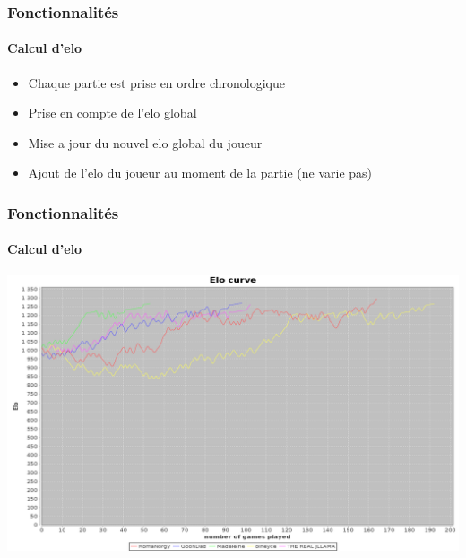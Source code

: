 \documentclass{beamer}
\begin{document}
\begin{frame}
  \frametitle{Fonctionnalités}
  \framesubtitle{Calcul d'elo}
  \begin{itemize}
  \item Chaque partie est prise en ordre chronologique
  \item Prise en compte de l'elo global
  \item Mise a jour du nouvel elo global du joueur
  \item Ajout de l'elo du joueur au moment de la partie (ne varie pas)
  \end{itemize}
\end{frame}

\begin{frame}
  \frametitle{Fonctionnalités}
  \framesubtitle{Calcul d'elo}
  \begin{center}
    \includegraphics[scale=0.15,keepaspectratio]{elo}
  \end{center}
\end{frame}
\end{document}
